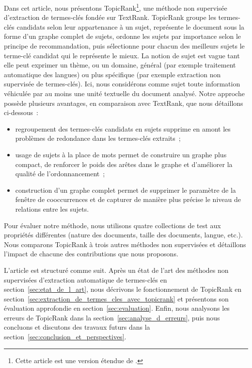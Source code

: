   Dans cet article, nous présentons TopicRank\footnote{Cette article est une
  version étendue de \cite{bougouin2013topicrank}.}, une méthode non supervisée
  d'extraction de termes-clés fondée sur TextRank. TopicRank groupe les
  termes-clés candidats selon leur appartenance à un sujet, représente le
  document sous la forme d'un graphe complet de sujets, ordonne les sujets par
  importance selon le principe de recommandation, puis sélectionne pour chacun
  des meilleurs sujets le terme-clé candidat qui le représente le mieux. La
  notion de sujet est vague tant elle peut exprimer un thème, ou un domaine,
  général (par exemple \og{}traitement automatique des langues\fg{}) ou plus
  spécifique (par exemple \og{}extraction non supervisée de termes-clés\fg{}). Ici,
  nous considérons comme sujet toute information véhiculée par au moins une
  unité textuelle du document analysé. Notre approche possède plusieurs
  avantages, en comparaison avec TextRank, que nous détaillons ci-dessous~:
  \begin{itemize}
    \item{regroupement des termes-clés candidats en sujets supprime en amont
          les problèmes de redondance dans les termes-clés extraits~;}
    \item{usage de sujets à la place de mots permet de construire un graphe
          plus compact, de renforcer le poids des arêtes dans le graphe et
          d'améliorer la qualité de l'ordonnancement~;}
    \item{construction d'un graphe complet permet de supprimer le paramètre
          de la fenêtre de cooccurrences et de capturer de manière plus précise
          le niveau de relations entre les sujets.}
  \end{itemize}

  Pour évaluer notre méthode, nous utilisons quatre collections de test aux
  propriétés différentes (nature des documents, taille des documents, langue,
  etc.). Nous comparons TopicRank à trois autres méthodes non supervisées et
  détaillons l'impact de chacune des contributions que nous proposons.

  L'article est structuré comme suit. Après un état de l'art des méthodes non
  supervisées d'extraction automatique de termes-clés en
  section~\ref{sec:etat_de_l_art}, nous décrivons le fonctionnement de
  Topic\-Rank en section~\ref{sec:extraction_de_termes_cles_avec_topicrank} et
  présentons son évaluation approfondie en section~\ref{sec:evaluation}. Enfin,
  nous analysons les erreurs de TopicRank dans la
  section~\ref{sec:analyse_d_erreurs}, puis nous concluons et discutons des
  travaux futurs dans la section~\ref{sec:conclusion_et_perspectives}.

